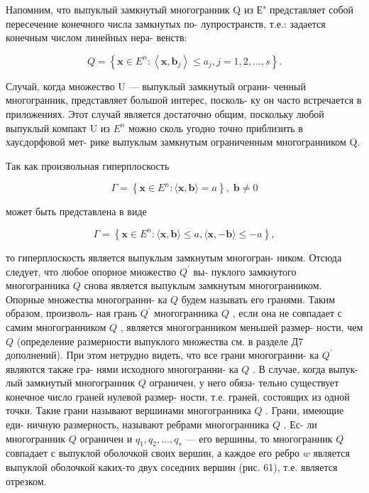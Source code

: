 \documentclass[8pt]{extarticle}
\begin{document}
Напомним, что выпуклый замкнутый многогранник Q из Е" представляет собой пересечение конечного числа замкнутых по- лупространств, т.е.: задается конечным числом линейных нера- венств:

\[
Q = \left\{  {\mathbf{x} \in  {E}^{n} : \left\langle  {\mathbf{x},{\mathbf{b}}_{j}}\right\rangle   \leq  {a}_{j},j = 1,2,\ldots ,s}\right\}  .
\]

Случай, когда множество U — выпуклый замкнутый ограни- ченный многогранник, представляет большой интерес, посколь- ку он часто встречается в приложениях. Этот случай является достаточно общим, поскольку любой выпуклый компакт U из \({E}^{n}\) можно сколь угодно точно приблизить в хаусдорфовой мет- рике выпуклым замкнутым ограниченным многогранником Q.

Так как произвольная гиперплоскость

\[
\Gamma  = \left\{  {\mathbf{x} \in  {E}^{n} : \langle \mathbf{x},\mathbf{b}\rangle  = a}\right\}  ,\;\mathbf{b} \neq  0
\]

может быть представлена в виде

\[
\Gamma  = \left\{  {\mathbf{x} \in  {E}^{n} : \langle \mathbf{x},\mathbf{b}\rangle  \leq  a,\langle \mathbf{x}, - \mathbf{b}\rangle  \leq   - a}\right\}  ,
\]

то гиперплоскость является выпуклым замкнутым многогран- ником. Отсюда следует, что любое опорное множество \({Q}^{\prime }\) вы- пуклого замкнутого многогранника \(Q\) снова является выпуклым замкнутым многогранником. Опорные множества многогранни- ка \(Q\) будем называть его гранями. Таким образом, произволь- ная грань \({Q}^{\prime }\) многогранника \(Q\) , если она не совпадает с самим многогранником \(Q\) , является многогранником меньшей размер- ности, чем \(Q\) (определение размерности выпуклого множества см. в разделе Д7 дополнений). При этом нетрудно видеть, что все грани многогранни- ка \({Q}^{\prime }\) являются также гра- нями исходного многогранни- ка \(Q\) . В случае, когда выпук- лый замкнутый многогранник \(Q\) ограничен, у него обяза- тельно существует конечное число граней нулевой размер- ности, т.е. граней, состоящих из одной точки. Такие грани называют вершинами многогранника \(Q\) . Грани, имеющие еди- ничную размерность, называют ребрами многогранника \(Q\) . Ес- ли многогранник \(Q\) ограничен и \({q}_{1},{q}_{2},\ldots ,{q}_{s}\) — его вершины, то многогранник \(Q\) совпадает с выпуклой оболочкой своих вершин, а каждое его ребро \(w\) является выпуклой оболочкой каких-то двух соседних вершин (рис. 61), т.е. является отрезком.
\end{document}
